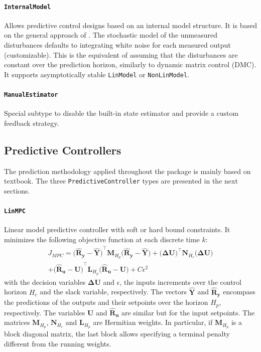\paragraph{\textnormal{\texttt{InternalModel}}}
Allows predictive control designs based on an internal model structure. It is based on the general approach of \citet{globPC}. The stochastic model of the unmeasured disturbances defaults to integrating white noise for each measured output (customizable). This is the equivalent of assuming that the disturbances are constant over the prediction horizon, similarly to dynamic matrix control (DMC). It supports asymptotically stable \texttt{LinModel} or \texttt{NonLinModel}.

\paragraph{\textnormal{\texttt{ManualEstimator}}}
Special subtype to disable the built-in state estimator and provide a custom feedback strategy.

\subsection{Predictive Controllers}

The prediction methodology applied throughout the package is mainly based on \citet{mpcMac} textbook. The three \texttt{PredictiveController} types are presented in the next sections.

\paragraph{\textnormal{\texttt{LinMPC}}}
Linear model predictive controller with soft or hard bound constraints. It minimizes the following objective function at each discrete time $k$:
\begin{multline}\label{eq:J_MPC}\!\!
J_{\mathit{MPC}} = 
    \mathbf{\big(\hat{R}_y - \hat{Y}\big)}^\intercal \mathbf{M}_{H_p} \mathbf{\big(\hat{R}_y - \hat{Y}\big)}   
    + \mathbf{\big(ΔU\big)}^\intercal \mathbf{N}_{H_c} \mathbf{\big(ΔU\big)} \\
    + \mathbf{\big(\hat{R}_u - U\big)}^\intercal \mathbf{L}_{H_p} \mathbf{\big(\hat{R}_u - U\big)} 
    + C \epsilon^2
\end{multline}
with the decision variables $\mathbf{ΔU}$ and $\epsilon$, the inputs increments over the control horizon $H_c$ and the slack variable, respectively. The vectors $\mathbf{\hat{Y}}$ and $\mathbf{\hat{R}_y}$ encompass the predictions of the outputs and their setpoints over the horizon $H_p$, respectively. The variables $\mathbf{U}$ and $\mathbf{\hat{R}_u}$ are similar but for the input setpoints. The matrices $\mathbf{M}_{H_p}$, $\mathbf{N}_{H_c}$ and $\mathbf{L}_{H_p}$ are Hermitian weights. In particular, if $\mathbf{M}_{H_p}$ is a block diagonal matrix, the last block allows specifying a terminal penalty different from the running weights.

